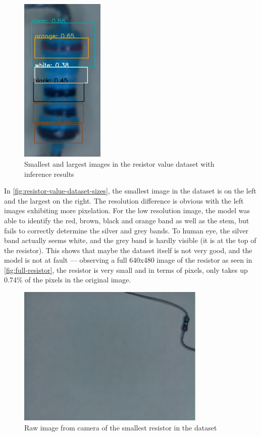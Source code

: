 \begin{figure}[H]
\begin{minipage}{0.49\textwidth}
  \end{minipage}
  \hfill
  \begin{minipage}{0.49\textwidth}
      \centering
      \includegraphics[height=8cm]{imgs/cv/banddetect.jpg}
  \end{minipage}
  \caption{Smallest and largest images in the resistor value dataset with inference results}
  \label{fig:resistor-value-dataset-sizes}
\end{figure}

In \autoref{fig:resistor-value-dataset-sizes}, the smallest image in the dataset is on the left and the largest on the right. The resolution difference is obvious with the left images exhibiting more pixelation. For the low resolution image, the model was able to identify the red, brown, black and orange band as well as the stem, but fails to correctly determine the silver and grey bands. To human eye, the silver band actually seems white, and the grey band is hardly visible (it is at the top of the resistor). This shows that maybe the dataset itself is not very good, and the model is not at fault --- observing a full 640x480 image of the resistor as seen in \autoref{fig:full-resistor}, the resistor is very small and in terms of pixels, only takes up 0.74\% of the pixels in the original image.\begin{figure}[H]
  \centering
  \includegraphics[width=0.8\textwidth]{imgs/cv/fullresistor.png}
  \caption{Raw image from camera of the smallest resistor in the dataset}
  \label{fig:full-resistor}
\end{figure}

